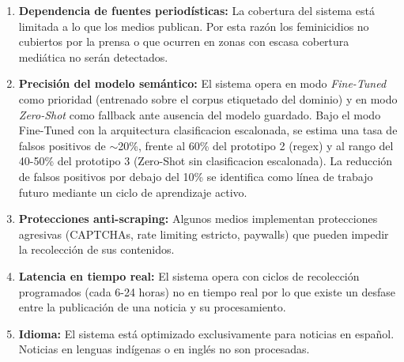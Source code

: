 \begin{enumerate}
    \item \textbf{Dependencia de fuentes periodísticas:} La cobertura del sistema está limitada a lo que los medios publican.
    Por esta razón los feminicidios no cubiertos por la prensa o que ocurren en zonas con escasa cobertura mediática no serán detectados.
    
    \item \textbf{Precisión del modelo semántico:} El sistema opera en modo \textit{Fine-Tuned}
    como prioridad (entrenado sobre el corpus etiquetado del dominio) y en modo
    \textit{Zero-Shot} como fallback ante ausencia del modelo guardado. Bajo el
    modo Fine-Tuned con la arquitectura clasificacion escalonada, se estima una tasa
    de falsos positivos de $\sim$20\%, frente al 60\% del prototipo 2 (regex) y
    al rango del 40-50\% del prototipo 3 (Zero-Shot sin clasificacion escalonada).
    La reducción de falsos positivos por debajo del 10\% se identifica como línea
    de trabajo futuro mediante un ciclo de aprendizaje activo.
    
    \item \textbf{Protecciones anti-scraping:} Algunos medios implementan protecciones agresivas (CAPTCHAs, rate limiting estricto,
    paywalls) que pueden impedir la recolección de sus contenidos.
    
    \item \textbf{Latencia en tiempo real:} El sistema opera con ciclos de recolección programados (cada 6-24 horas) no en tiempo real por
    lo que existe un desfase entre la publicación de una noticia y su procesamiento.
    
    \item \textbf{Idioma:} El sistema está optimizado exclusivamente para noticias en español. Noticias en lenguas indígenas o en inglés no son procesadas.
\end{enumerate}
